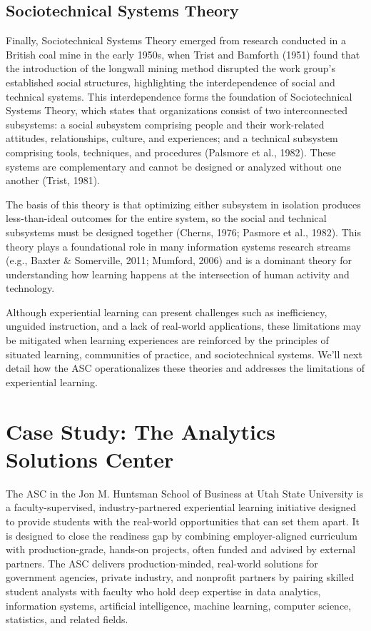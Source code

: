 \documentclass[
  12pt]{article}
\begin{document}
\subsection{Sociotechnical Systems
Theory}\label{sociotechnical-systems-theory}

Finally, Sociotechnical Systems Theory emerged from research conducted
in a British coal mine in the early 1950s, when Trist and Bamforth
(1951) found that the introduction of the longwall mining method
disrupted the work group's established social structures, highlighting
the interdependence of social and technical systems. This
interdependence forms the foundation of Sociotechnical Systems Theory,
which states that organizations consist of two interconnected
subsystems: a social subsystem comprising people and their work-related
attitudes, relationships, culture, and experiences; and a technical
subsystem comprising tools, techniques, and procedures (Palsmore et al.,
1982). These systems are complementary and cannot be designed or
analyzed without one another (Trist, 1981).

The basis of this theory is that optimizing either subsystem in
isolation produces less-than-ideal outcomes for the entire system, so
the social and technical subsystems must be designed together (Cherns,
1976; Pasmore et al., 1982). This theory plays a foundational role in
many information systems research streams (e.g., Baxter \& Somerville,
2011; Mumford, 2006) and is a dominant theory for understanding how
learning happens at the intersection of human activity and technology.

Although experiential learning can present challenges such as
inefficiency, unguided instruction, and a lack of real-world
applications, these limitations may be mitigated when learning
experiences are reinforced by the principles of situated learning,
communities of practice, and sociotechnical systems. We'll next detail
how the ASC operationalizes these theories and addresses the limitations
of experiential learning.

\section{Case Study: The Analytics Solutions Center}\label{sec-case}

The ASC in the Jon M. Huntsman School of Business at Utah State
University is a faculty-supervised, industry-partnered experiential
learning initiative designed to provide students with the real-world
opportunities that can set them apart. It is designed to close the
readiness gap by combining employer-aligned curriculum with
production-grade, hands-on projects, often funded and advised by
external partners. The ASC delivers production-minded, real-world
solutions for government agencies, private industry, and nonprofit
partners by pairing skilled student analysts with faculty who hold deep
expertise in data analytics, information systems, artificial
intelligence, machine learning, computer science, statistics, and
related fields.
\end{document}
